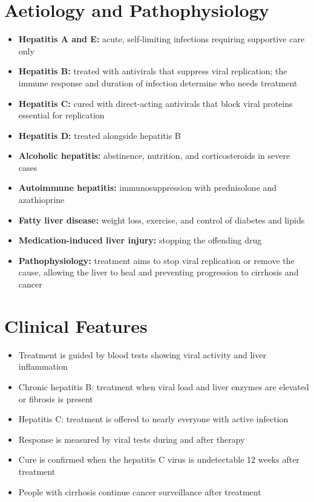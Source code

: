 \section*{Aetiology and Pathophysiology}
\begin{itemize}
    \item \textbf{Hepatitis A and E:} acute, self-limiting infections requiring supportive care only
    \item \textbf{Hepatitis B:} treated with antivirals that suppress viral replication; the immune response and duration of infection determine who needs treatment
    \item \textbf{Hepatitis C:} cured with direct-acting antivirals that block viral proteins essential for replication
    \item \textbf{Hepatitis D:} treated alongside hepatitis B
    \item \textbf{Alcoholic hepatitis:} abstinence, nutrition, and corticosteroids in severe cases
    \item \textbf{Autoimmune hepatitis:} immunosuppression with prednisolone and azathioprine
    \item \textbf{Fatty liver disease:} weight loss, exercise, and control of diabetes and lipids
    \item \textbf{Medication-induced liver injury:} stopping the offending drug
    \item \textbf{Pathophysiology:} treatment aims to stop viral replication or remove the cause, allowing the liver to heal and preventing progression to cirrhosis and cancer
\end{itemize}

\section*{Clinical Features}
\begin{itemize}
    \item Treatment is guided by blood tests showing viral activity and liver inflammation
    \item Chronic hepatitis B: treatment when viral load and liver enzymes are elevated or fibrosis is present
    \item Hepatitis C: treatment is offered to nearly everyone with active infection
    \item Response is measured by viral tests during and after therapy
    \item Cure is confirmed when the hepatitis C virus is undetectable 12 weeks after treatment
    \item People with cirrhosis continue cancer surveillance after treatment
\end{itemize}

